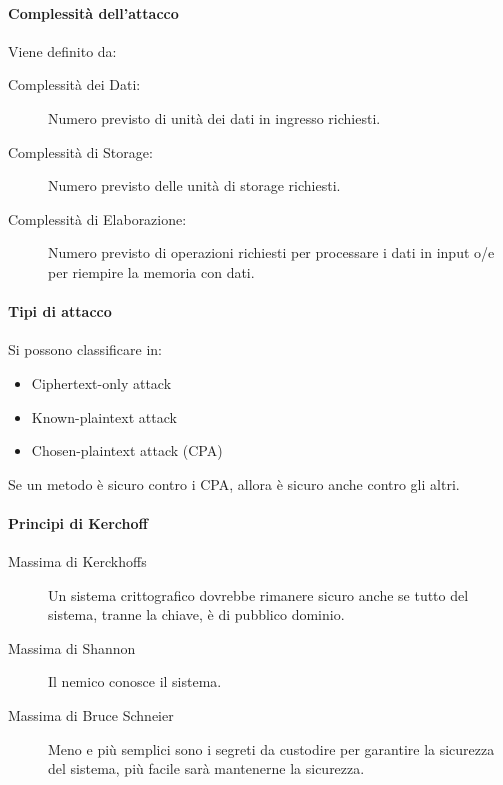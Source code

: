 \documentclass{report}
\begin{document}
          \paragraph{Complessità dell'attacco} Viene definito da:
                \begin{description}
                    \item[Complessità dei Dati:] Numero previsto di unità dei dati in ingresso richiesti.
                    \item[Complessità di Storage:] Numero previsto delle unità di storage richiesti.
                    \item[Complessità di Elaborazione:] Numero previsto di operazioni richiesti per processare i dati in input o/e per riempire la memoria con dati.
                \end{description}
            
           \paragraph{Tipi di attacco} Si possono classificare in:
               
                \begin{itemize}
                    \item Ciphertext-only attack
                    \item Known-plaintext attack
                    \item Chosen-plaintext attack (CPA)
                \end{itemize}
                Se un metodo è sicuro contro i CPA, allora è sicuro anche contro gli altri.
            \paragraph{Principi di Kerchoff}

            \begin{description}
                \item[Massima di Kerckhoffs] Un sistema crittografico dovrebbe rimanere sicuro anche se tutto del sistema, tranne la chiave, è di pubblico dominio.
                
                \item[Massima di Shannon] Il nemico conosce il sistema.
                
                \item[Massima di Bruce Schneier] Meno e più semplici sono i segreti da custodire per garantire la sicurezza del sistema, più facile sarà mantenerne la sicurezza.
            \end{description}
\end{document}
